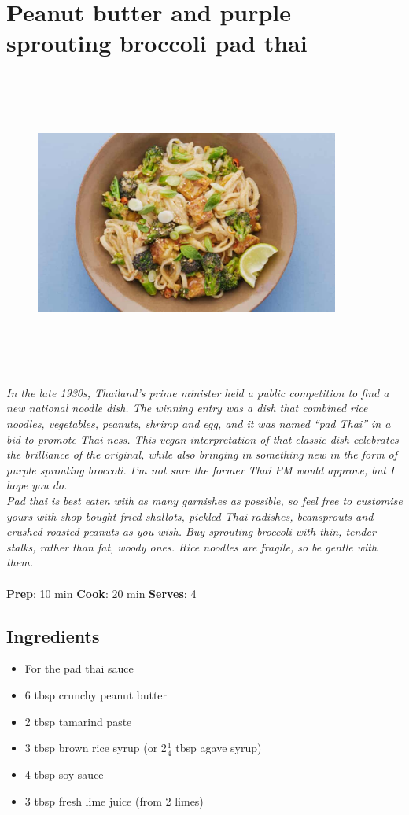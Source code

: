\documentclass{book}
\begin{document}
\section{Peanut butter and purple sprouting broccoli pad thai}
\begin{figure}
\centering\includegraphics[width=10cm,height=10cm,keepaspectratio]{Recipe_Pictures/Peanut_butter_and_purple_sprouting_broccoli_pad_thai.png}
\end{figure}
\emph{In the late 1930s, Thailand’s prime minister held a public competition to find a new national noodle dish. The winning entry was a dish that combined rice noodles, vegetables, peanuts, shrimp and egg, and it was named “pad Thai” in a bid to promote Thai-ness. This vegan interpretation of that classic dish celebrates the brilliance of the original, while also bringing in something new in the form of purple sprouting broccoli. I’m not sure the former Thai PM would approve, but I hope you do.\\ 
Pad thai is best eaten with as many garnishes as possible, so feel free to customise yours with shop-bought fried shallots, pickled Thai radishes, beansprouts and crushed roasted peanuts as you wish. Buy sprouting broccoli with thin, tender stalks, rather than fat, woody ones. Rice noodles are fragile, so be gentle with them.}\\\\ 
\textbf{Prep}: 10 min
\textbf{Cook}: 20 min
\textbf{Serves}: 4
\subsection*{Ingredients}
\begin{itemize}
\item For the pad thai sauce
\item 6 tbsp crunchy peanut butter
\item 2 tbsp tamarind paste
\item 3 tbsp brown rice syrup (or 2$\frac{1}{4}$ tbsp agave syrup)
\item 4 tbsp soy sauce
\item 3 tbsp fresh lime juice (from 2 limes)
\end{itemize}
\end{document}
